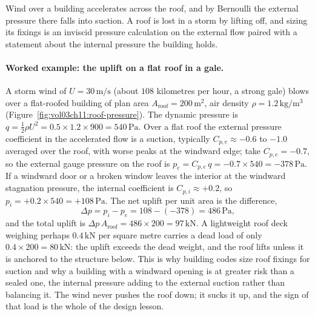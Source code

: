 Wind over a building accelerates across the roof, and by Bernoulli the
external pressure there falls into suction. A roof is lost in a storm
by lifting off, and sizing its fixings is an inviscid pressure
calculation on the external flow paired with a statement about the
internal pressure the building holds.



\paragraph{Worked example: the uplift on a flat roof in a gale.} A
storm wind of $U = 30\,\si{\meter\per\second}$ (about $108$ kilometres
per hour, a strong gale) blows over a flat-roofed building of plan
area $A_\text{roof} = 200\,\si{\meter}^2$, air density $\rho =
1.2\,\si{\kilogram\per\meter\cubed}$
(Figure~\ref{fig:vol03ch11:roof-pressure}). The dynamic pressure is
$q = \tfrac12\rho U^2 = 0.5\times 1.2\times 900 = 540\,\text{Pa}$. Over
a flat roof the external pressure coefficient in the accelerated flow
is a suction, typically $C_{p,e} \approx -0.6$ to $-1.0$ averaged over
the roof, with worse peaks at the windward edge; take $C_{p,e} =
-0.7$, so the external gauge pressure on the roof is $p_e = C_{p,e}\,q
= -0.7\times 540 = -378\,\text{Pa}$. If a windward door or a broken
window leaves the interior at the windward stagnation pressure, the
internal coefficient is $C_{p,i} \approx +0.2$, so $p_i = +0.2\times
540 = +108\,\text{Pa}$. The net uplift per unit area is the difference,
\[
\Delta p = p_i - p_e = 108 - (-378) = 486\,\text{Pa},
\]
and the total uplift is $\Delta p\,A_\text{roof} = 486\times 200 =
97\,\si{\kilo\newton}$. A lightweight roof deck weighing perhaps
$0.4\,\si{\kilo\newton}$ per square metre carries a dead load of only
$0.4\times 200 = 80\,\si{\kilo\newton}$: the uplift exceeds the dead
weight, and the roof lifts unless it is anchored to the structure
below. This is why building codes size roof fixings for suction and
why a building with a windward opening is at greater risk than a
sealed one, the internal pressure adding to the external suction
rather than balancing it. The wind never pushes the roof down; it
sucks it up, and the sign of that load is the whole of the design
lesson.

